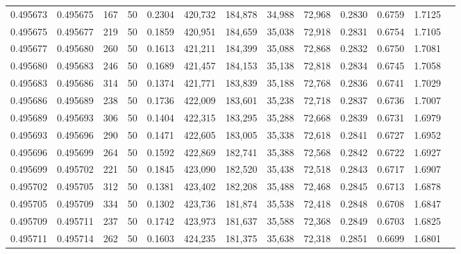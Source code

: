 \begin{tabular}{rrrrrrrrrrrrr}
0.495673 & 0.495675 &   167 &  50 &                                     0.2304 & 420,732 & 184,878 &  34,988 &  72,968 & 0.2830 & 0.6759 & 1.7125 \\
0.495675 & 0.495677 &   219 &  50 &                                     0.1859 & 420,951 & 184,659 &  35,038 &  72,918 & 0.2831 & 0.6754 & 1.7105 \\
0.495677 & 0.495680 &   260 &  50 &                                     0.1613 & 421,211 & 184,399 &  35,088 &  72,868 & 0.2832 & 0.6750 & 1.7081 \\
0.495680 & 0.495683 &   246 &  50 &                                     0.1689 & 421,457 & 184,153 &  35,138 &  72,818 & 0.2834 & 0.6745 & 1.7058 \\
0.495683 & 0.495686 &   314 &  50 &                                     0.1374 & 421,771 & 183,839 &  35,188 &  72,768 & 0.2836 & 0.6741 & 1.7029 \\
0.495686 & 0.495689 &   238 &  50 &                                     0.1736 & 422,009 & 183,601 &  35,238 &  72,718 & 0.2837 & 0.6736 & 1.7007 \\
0.495689 & 0.495693 &   306 &  50 &                                     0.1404 & 422,315 & 183,295 &  35,288 &  72,668 & 0.2839 & 0.6731 & 1.6979 \\
0.495693 & 0.495696 &   290 &  50 &                                     0.1471 & 422,605 & 183,005 &  35,338 &  72,618 & 0.2841 & 0.6727 & 1.6952 \\
0.495696 & 0.495699 &   264 &  50 &                                     0.1592 & 422,869 & 182,741 &  35,388 &  72,568 & 0.2842 & 0.6722 & 1.6927 \\
0.495699 & 0.495702 &   221 &  50 &                                     0.1845 & 423,090 & 182,520 &  35,438 &  72,518 & 0.2843 & 0.6717 & 1.6907 \\
0.495702 & 0.495705 &   312 &  50 &                                     0.1381 & 423,402 & 182,208 &  35,488 &  72,468 & 0.2845 & 0.6713 & 1.6878 \\
0.495705 & 0.495709 &   334 &  50 &                                     0.1302 & 423,736 & 181,874 &  35,538 &  72,418 & 0.2848 & 0.6708 & 1.6847 \\
0.495709 & 0.495711 &   237 &  50 &                                     0.1742 & 423,973 & 181,637 &  35,588 &  72,368 & 0.2849 & 0.6703 & 1.6825 \\
0.495711 & 0.495714 &   262 &  50 &                                     0.1603 & 424,235 & 181,375 &  35,638 &  72,318 & 0.2851 & 0.6699 & 1.6801 \\

\end{tabular}
